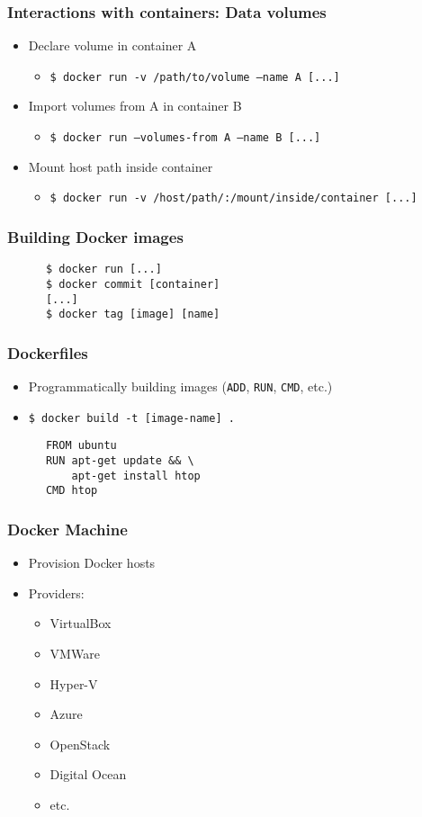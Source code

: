 \documentclass[xetex,mathserif,serif]{beamer}
\begin{document}
  \begin{frame}
    \frametitle{Interactions with containers: Data volumes}
    \begin{itemize}
      \item Declare volume in container A
        \begin{itemize}
          \item \texttt{\$ docker run -v /path/to/volume --name A [...]}
        \end{itemize}
      \item Import volumes from A in container B
        \begin{itemize}
          \item \texttt{\$ docker run --volumes-from A --name B [...]}
        \end{itemize}
      \item Mount host path inside container
        \begin{itemize}
          \item \texttt{\$ docker run -v /host/path/:/mount/inside/container [...]}
        \end{itemize}
    \end{itemize}
  \end{frame}
  \begin{frame}[fragile=singleslide]
    \frametitle{Building Docker images}
    \begin{verbatim}
      $ docker run [...]
      $ docker commit [container]
      [...]
      $ docker tag [image] [name]
    \end{verbatim}
  \end{frame}
  \begin{frame}[fragile=singleslide]
    \frametitle{Dockerfiles}
    \begin{itemize}
      \item Programmatically building images (\texttt{ADD}, \texttt{RUN}, \texttt{CMD}, etc.)
      \item \texttt{\$ docker build -t [image-name] .}
    \end{itemize}
    \begin{verbatim}
      FROM ubuntu
      RUN apt-get update && \
          apt-get install htop
      CMD htop
    \end{verbatim}
  \end{frame}
  \begin{frame}
    \frametitle{Docker Machine}
    \begin{itemize}
      \item Provision Docker hosts
      \item Providers:
        \begin{itemize}
          \item VirtualBox
          \item VMWare
          \item Hyper-V
          \item Azure
          \item OpenStack
          \item Digital Ocean
          \item etc.
        \end{itemize}
    \end{itemize}
  \end{frame}
\end{document}
